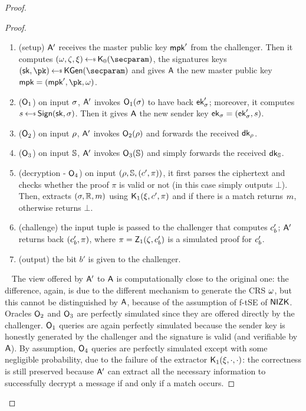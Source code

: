 \begin{proof}
\begin{lemma}
\begin{proof}
            \begin{enumerate}
                \item (setup) $\mathsf{A}'$ receives the master public key $\mathsf{mpk}'$ from the challenger. Then it computes $(\crs,\tpsim,\tpext)\getsr\nizkext_0(\secparam)$, the signatures keys $(\sk, \pk) \getsr \kgen(\secparam)$ and gives $\mathsf{A}$ the new master public key $\mpk = (\mpk', \pk, \crs)$.
                \item ($\mathsf{O}_1$) on input $\sigma$, $\mathsf{A}'$ invokes $\mathsf{O}_1(\sigma)$ to have back $\mathsf{ek}'_\sigma$; moreover, it computes $\signature \getsr \sign(\sk, \sattr)$. Then it gives $\mathsf{A}$ the new sender key $\mathsf{ek}_\sigma = (\mathsf{ek}'_\sigma, s)$.
                \item ($\mathsf{O}_2$) on input $\rho$, $\mathsf{A}'$ invokes $\mathsf{O}_2(\rho)$ and forwards the received $\mathsf{dk}_\rho$.
                \item ($\mathsf{O}_3$) on input $\mathbb{S}$, $\mathsf{A}'$ invokes $\mathsf{O}_3(\mathbb{S})$ and simply forwards the received $\mathsf{dk}_{\mathbb{S}}$.
                \item (decryption - $\mathsf{O}_4$) on input $(\rho, \mathbb{S}, (c', \pi))$, it first parses the ciphertext and checks whether the proof $\pi$ is valid or not (in this case simply outputs $\bot$). Then, extracts $(\sigma, \mathbb{R}, m)$ using $\mathsf{K}_1(\xi,c',\pi)$ and if there is a match returns $m$, otherwise returns $\bot$.
                \item (challenge) the input tuple is passed to the challenger that computes $c'_b$; $\mathsf{A}'$ returns back $(c'_b, \pi)$, where $\pi = \mathsf{Z}_1(\zeta, c'_b)$ is a simulated proof for $c'_b$.
                \item (output) the bit $b'$ is given to the challenger.
            \end{enumerate}
            ~\newline
            The view offered by $\mathsf{A}'$ to $\mathsf{A}$ is computationally close to the original one: the difference, again, is due to the different mechanism to generate the CRS $\omega$, but this cannot be distinguished by $\mathsf{A}$, because of the assumption of f-tSE of $\mathsf{NIZK}$.
            Oracles $\mathsf{O}_2$ and $\mathsf{O}_3$ are perfectly simulated since they are offered directly by the challenger.
            $\mathsf{O}_1$ queries are again perfectly simulated because the sender key is honestly generated by the challenger and the signature is valid (and verifiable by $\mathsf{A}$).
            By assumption, $\mathsf{O}_4$ queries are perfectly simulated except with some negligible probability, due to the failure of the extractor $\mathsf{K}_1(\xi, \cdot, \cdot)$: the correctness is still preserved because $\mathsf{A}'$ can extract all the necessary information to successfully decrypt a message if and only if a match occurs.
        \end{proof}
    \end{lemma}


\end{proof}
